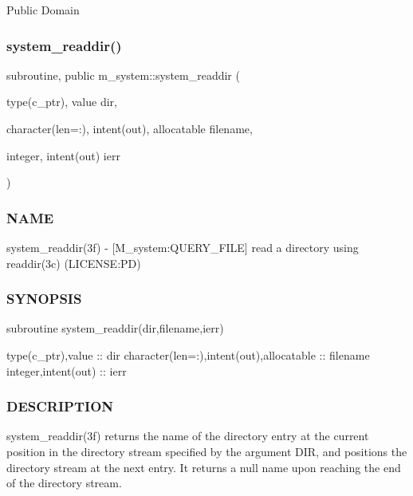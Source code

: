 Public Domain \mbox{\label{namespacem__system_a983df5b2d7cb5842d69c4a31829403e0}} 
\subsubsection{\texorpdfstring{system\+\_\+readdir()}{system\_readdir()}}
{\footnotesize\ttfamily subroutine, public m\+\_\+system\+::system\+\_\+readdir (\begin{DoxyParamCaption}\item[{type(c\+\_\+ptr), value}]{dir,  }\item[{character(len=\+:), intent(out), allocatable}]{filename,  }\item[{integer, intent(out)}]{ierr }\end{DoxyParamCaption})}



\subsubsection*{N\+A\+ME}

system\+\_\+readdir(3f) -\/ \mbox{[}M\+\_\+system\+:Q\+U\+E\+R\+Y\+\_\+\+F\+I\+LE\mbox{]} read a directory using readdir(3c) (L\+I\+C\+E\+N\+SE\+:PD) \subsubsection*{S\+Y\+N\+O\+P\+S\+IS}

subroutine system\+\_\+readdir(dir,filename,ierr)

type(c\+\_\+ptr),value \+:\+: dir character(len=\+:),intent(out),allocatable \+:\+: filename integer,intent(out) \+:\+: ierr

\subsubsection*{D\+E\+S\+C\+R\+I\+P\+T\+I\+ON}

\begin{DoxyVerb}system_readdir(3f) returns the name of the directory entry at the
current position in the directory stream specified by the argument
DIR, and positions the directory stream at the next entry. It returns
a null name upon reaching the end of the directory stream.
\end{DoxyVerb}


